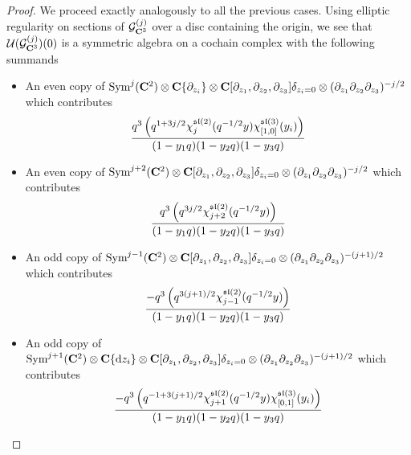 \documentclass[../main.tex]{subfiles}
\begin{document}
\begin{proof}
We proceed exactly analogously to all the previous cases. Using elliptic regularity on sections of $\mathcal{G}^{(j)}_{\mathbf{C}^3}$ over a disc containing the origin, we see that $\mathcal{U} (\mathcal{G}^{(j)}_{\mathbf{C}^3} )(0)$ is a symmetric algebra on a cochain complex with the following summands

\begin{itemize}
\item An even copy of $\text{Sym}^j (\mathbf{C}^2) \otimes \mathbf{C}\{\partial_{z_i}\}\otimes \mathbf{C}[\partial_{z_1}, \partial_{z_2}, \partial_{z_3}]\delta_{z_i=0}\otimes (\partial_{z_1}\partial_{z_2}\partial_{z_3})^{-j/2}$ which contributes 
\begin{equation}
\frac{ q^{3} \left(  q^{1 + 3 j/2} \chi^{\mathfrak{sl}(2)}_{j}(q^{-1/2} y)\chi^{\mathfrak{sl}(3)}_{[1,0]}(y_i) \right)}{(1-y_1 q)(1-y_2q)(1-y_3q)}
\end{equation} 

\item An even copy of $\text{Sym}^{j+2} (\mathbf{C}^2) \otimes \mathbf{C}[\partial_{z_1}, \partial_{z_2}, \partial_{z_3}]\delta_{z_i=0}\otimes (\partial_{z_1}\partial_{z_2}\partial_{z_3})^{-j/2}$ which contributes 
\begin{equation}
\frac{ q^{3} \left( q^{3j/2} \chi^{\mathfrak{sl}(2)}_{j+2}(q^{-1/2} y)  \right)}{(1-y_1 q)(1-y_2q)(1-y_3q)}
\end{equation} 

\item An odd copy of $\text{Sym}^{j-1} (\mathbf{C}^2) \otimes \mathbf{C}[\partial_{z_1}, \partial_{z_2}, \partial_{z_3}]\delta_{z_i=0}\otimes (\partial_{z_1}\partial_{z_2}\partial_{z_3})^{-(j+1)/2}$ which contributes 
\begin{equation}
\frac{ - q^{3} \left( q^{3(j+1)/2} \chi^{\mathfrak{sl}(2)}_{j-1}(q^{-1/2}y) \right)}{(1-y_1 q)(1-y_2q)(1-y_3q)}
\end{equation} 

\item An odd copy of $\text{Sym}^{j+1} (\mathbf{C}^2) \otimes \mathbf{C}\{\mathrm{d} z_i\}\otimes \mathbf{C}[\partial_{z_1}, \partial_{z_2}, \partial_{z_3}]\delta_{z_i=0}\otimes (\partial_{z_1}\partial_{z_2}\partial_{z_3})^{-(j+1)/2}$ which contributes 
\begin{equation}
\frac{ - q^{3} \left( q^{-1 + 3(j+1)/2} \chi^{\mathfrak{sl}(2)}_{j+1} (q^{-1/2} y) \chi^{\mathfrak{sl}(3)}_{[0,1]}(y_i) \right)}{(1-y_1 q)(1-y_2q)(1-y_3q)}
\end{equation} 

\end{itemize}
\end{proof}
\end{document}
